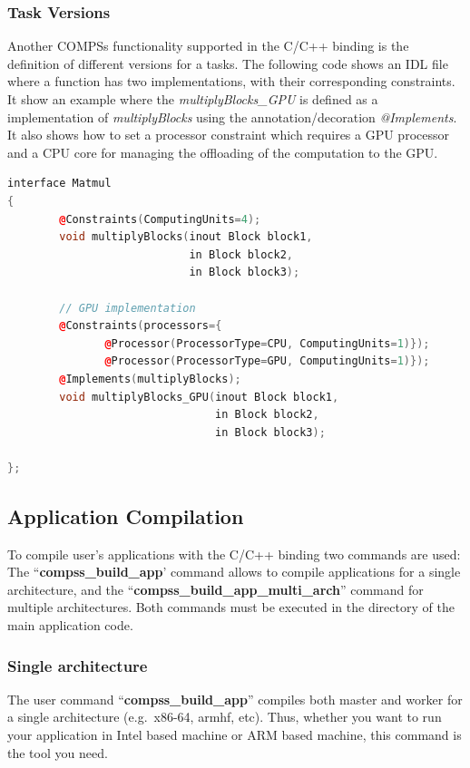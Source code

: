 \subsubsection{Task Versions}
Another COMPSs functionality supported in the C/C++ binding is the definition of different versions for a tasks. 
The following code shows an IDL file where a function has two implementations, with their corresponding constraints. 
It show an example where the \textit{multiplyBlocks\_GPU} is defined as a implementation of \textit{multiplyBlocks} using the annotation/decoration \textit{@Implements}. 
It also shows how to set a processor constraint which requires a GPU processor and a CPU core for managing the offloading of the computation to the GPU. 
\begin{lstlisting}[language=C++]
interface Matmul
{
        @Constraints(ComputingUnits=4);
        void multiplyBlocks(inout Block block1, 
                            in Block block2,
                            in Block block3);

        // GPU implementation 
        @Constraints(processors={
               @Processor(ProcessorType=CPU, ComputingUnits=1)});
               @Processor(ProcessorType=GPU, ComputingUnits=1)});
        @Implements(multiplyBlocks);
        void multiplyBlocks_GPU(inout Block block1,
                                in Block block2, 
                                in Block block3); 
                          
};
\end{lstlisting}



\subsection{Application Compilation}

To compile user's applications with the C/C++ binding two commands are used: The ``{\bf compss\_build\_app}' command allows to compile applications for a single architecture, and the ``{\bf compss\_build\_app\_multi\_arch}'' command for multiple architectures. Both commands must be executed in the directory of the main application code. 

\subsubsection{Single architecture}

The user command ``{\bf compss\_build\_app}'' compiles both master and worker for a single architecture (e.g.\ x86-64, armhf, etc). Thus, whether you want to run your application in Intel based machine or ARM based machine, this command is the tool you need.

